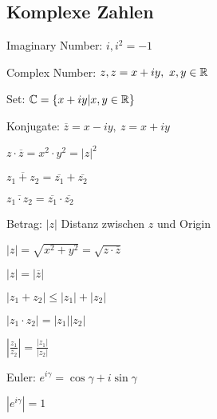\subsection{Komplexe Zahlen}
\begin{compactdesc}
    \item[Imaginary Number:] $i, i^2 = -1$
    \item[Complex Number:] $z, z = x + iy, \ x, y \in \mathbb{R}$
    \item[Set:] $\mathbb{C} = \{x + iy | x,y \in \mathbb{R}\}$
    \item[Konjugate:] $\overline{z} = x - iy, \ z = x + iy$
        \begin{compactitem}
            \item $z \cdot \overline{z} = x^2 \cdot y^2 = |z|^2$
            \item $\overline{z_1 + z_2} = \overline{z_1} + \overline{z_2}$
            \item $\overline{z_1 \cdot z_2} = \overline{z_1} \cdot \overline{z_2}$
        \end{compactitem}
    \item[Betrag:] $|z|$ Distanz zwischen $z$ und Origin
        \begin{compactitem}
            \item $|z| = \sqrt{x^2 + y^2} = \sqrt{z \cdot \overline{z}} $
            \item $|z| = |\overline{z}|$
            \item $|z_1 + z_2| \le |z_1| + |z_2|$
            \item $|z_1 \cdot z_2| = |z_1||z_2|$
            \item $|\frac{z_1}{z_2}| = \frac{|z_1|}{|z_2|}$
        \end{compactitem}
    \item[Euler:] $e^{i\gamma} = \cos \gamma + i \sin \gamma$
        \begin{compactitem}
            \item $|e^{i \gamma}| = 1$
        \end{compactitem}
\end{compactdesc}


